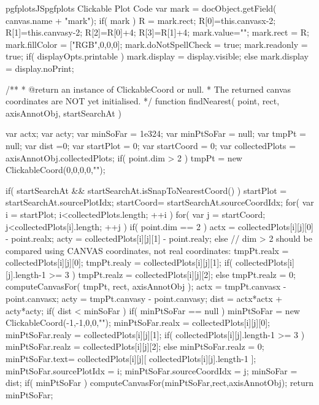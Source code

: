 {{\begin{insDLJS}[processAnnotatedPlot]{pgfplotsJS}{pgfplots Clickable Plot Code}
{{		var mark = docObject.getField( canvas.name + "mark");
		if( mark ) {
			R = mark.rect;
			R[0]=this.canvasx-2;
			R[1]=this.canvasy-2;
			R[2]=R[0]+4;
			R[3]=R[1]+4;
			mark.value="";
			mark.rect = R;
			mark.fillColor = ["RGB",0,0,0];
			mark.doNotSpellCheck = true;
			mark.readonly = true;
			if( displayOpts.printable )
				mark.display = display.visible;
			else
				mark.display = display.noPrint;
		}
	}
}

/**
 * @return an instance of ClickableCoord or null.
 * The returned canvas coordinates are NOT yet initialised.
 */
function findNearest( point, rect, axisAnnotObj, startSearchAt )
{
	var actx;
	var acty;
	var minSoFar = 1e324;
	var minPtSoFar = null;
	var tmpPt = null;
	var dist =0;
	var startPlot = 0;
	var startCoord = 0;
	var collectedPlots = axisAnnotObj.collectedPlots;
	if( point.dim > 2 )
		tmpPt = new ClickableCoord(0,0,0,0,"");
		
	if( startSearchAt && startSearchAt.isSnapToNearestCoord() ) {
		startPlot = startSearchAt.sourcePlotIdx;
		startCoord= startSearchAt.sourceCoordIdx;
	}
	for( var i = startPlot; i<collectedPlots.length; ++i ) {
		for( var j = startCoord; j<collectedPlots[i].length; ++j ) {
			if( point.dim == 2 ) {
				actx = collectedPlots[i][j][0] - point.realx;
				acty = collectedPlots[i][j][1] - point.realy;
			} else {
				// dim > 2 should be compared using CANVAS coordinates, not real coordinates:
				tmpPt.realx = collectedPlots[i][j][0];
				tmpPt.realy = collectedPlots[i][j][1];
				if( collectedPlots[i][j].length-1 >= 3 )
					tmpPt.realz = collectedPlots[i][j][2];
				else
					tmpPt.realz = 0;
				computeCanvasFor( tmpPt, rect, axisAnnotObj );
				actx = tmpPt.canvasx - point.canvasx;
				acty = tmpPt.canvasy - point.canvasy;
			}
			dist = actx*actx + acty*acty;
			if( dist < minSoFar ) {
			 	if( minPtSoFar == null )
					minPtSoFar = new ClickableCoord(-1,-1,0,0,"");
				minPtSoFar.realx = collectedPlots[i][j][0];
				minPtSoFar.realy = collectedPlots[i][j][1];
				if( collectedPlots[i][j].length-1 >= 3 )
					minPtSoFar.realz = collectedPlots[i][j][2];
				else
					minPtSoFar.realz = 0;
				minPtSoFar.text= collectedPlots[i][j][ collectedPlots[i][j].length-1 ];
				minPtSoFar.sourcePlotIdx = i;
				minPtSoFar.sourceCoordIdx = j;
				minSoFar = dist;
			}
		}
	}
	if( minPtSoFar )
		computeCanvasFor(minPtSoFar,rect,axisAnnotObj);
	return minPtSoFar;
}


\end{insDLJS}}}
